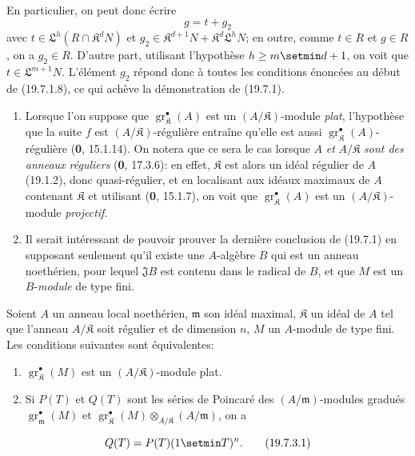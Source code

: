 
En particulier, on peut donc écrire
\[
  g=t+g_2
\]
avec $t\in\mathfrak L^h(R\cap\mathfrak K^dN)$ et $g_2\in\mathfrak K^{d+1}N+\mathfrak K^d\mathfrak L^hN$; en outre, comme $t\in R$ et $g\in R$, on a $g_2\in R$. D'autre part, utilisant l'hypothèse $h\geq m\setmin d+1$, on voit que $t\in\mathfrak L^{m+1}N$. L'élément $g_2$ répond donc à toutes les conditions énoncées au début de (19.7.1.8), ce qui achève la démonstration de (19.7.1).

\begin{remarks}[19.7.2]
\label{IV.19.7.2}
\begin{enumerate}
  \item[(i)] Lorsque l'on suppose que $\operatorname{gr}_{\mathfrak K}^\bullet(A)$ est un $(A/\mathfrak K)$-module \emph{plat}, l'hypothèse que la suite $f$ est $(A/\mathfrak K)$-régulière entraîne qu'elle est aussi $\operatorname{gr}_{\mathfrak K}^\bullet(A)$-régulière (\textbf{0}, 15.1.14). On notera que ce sera le cas lorsque $A$ \emph{et} $A/\mathfrak K$ \emph{sont des anneaux réguliers} (\textbf{0}, 17.3.6): en effet, $\mathfrak K$ est alors un idéal régulier de $A$ (19.1.2), donc quasi-régulier, et en localisant aux idéaux maximaux de $A$ contenant $\mathfrak K$ et utilisant (\textbf{0}, 15.1.7), on voit que $\operatorname{gr}_{\mathfrak K}^\bullet(A)$ est un $(A/\mathfrak K)$-module \emph{projectif}.
  \item[(ii)] Il serait intéressant de pouvoir prouver la dernière conclusion de (19.7.1) en supposant seulement qu'il existe une $A$-algèbre $B$ qui est un anneau noethérien, pour lequel $\mathfrak JB$ est contenu dans le radical de $B$, et que $M$ est un $B$-\emph{module} de type fini.
\end{enumerate}
\end{remarks}

\begin{corollary}[19.7.3]
\label{IV.19.7.3}
Soient $A$ un anneau local noethérien, $\mathfrak m$ son idéal maximal, $\mathfrak K$ un idéal de $A$ tel que l'anneau $A/\mathfrak K$ soit régulier et de dimension $n$, $M$ un $A$-module de type fini. Les conditions suivantes sont équivalentes:
\begin{enumerate}
  \item[\textup{a)}] $\operatorname{gr}_{\mathfrak K}^\bullet(M)$ est un $(A/\mathfrak K)$-module plat.
  \item[\textup{b)}] Si $P(T)$ et $Q(T)$ sont les séries de Poincaré des $(A/\mathfrak m)$-modules gradués $\operatorname{gr}_{\mathfrak m}^\bullet(M)$ et $\operatorname{gr}_{\mathfrak K}^\bullet(M)\otimes_{A/\mathfrak K}(A/\mathfrak m)$, on a
\end{enumerate}
\begin{equation}
  Q(T)=P(T)(1\setmin T)^n.
  \tag{19.7.3.1}\label{IV.19.7.3.1}
\end{equation}
\end{corollary}

